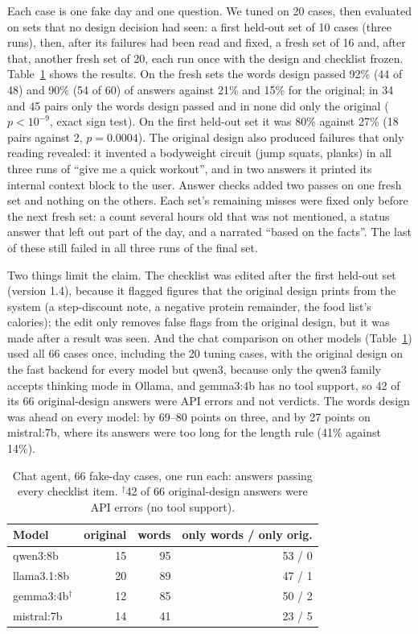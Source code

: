 \documentclass[10pt,twocolumn]{article}
\begin{document}
Each case is one fake day and one question. We tuned on 20 cases, then evaluated on sets that no design decision had seen:
a first held-out set of 10 cases (three runs), then, after its failures had been read and fixed, a fresh set of 16 and,
after that, another fresh set of 20, each run once with the design and checklist frozen. Table~\ref{tab:chat} shows the
results. On the fresh sets the words design passed 92\% (44 of 48) and 90\% (54 of 60) of answers against 21\% and 15\%
for the original; in 34 and 45 pairs only the words design passed and in none did only the original ($p<10^{-9}$, exact sign
test). On the first held-out set it was 80\% against 27\% (18 pairs against 2, $p=0.0004$). The original design also
produced failures that only reading revealed: it invented a bodyweight circuit (jump squats, planks) in all three runs of
``give me a quick workout'', and in two answers it printed its internal context block to the user. Answer checks added
two passes on one fresh set and nothing on the others. Each set's remaining misses were fixed only before the next
fresh set: a count several hours old that was not mentioned, a status answer that left out part of the day, and a narrated
``based on the facts''. The last of these still failed in all three runs of the final set.

Two things limit the claim. The checklist was edited after the first held-out set (version 1.4), because it flagged
figures that the original design prints from the system (a step-discount note, a negative protein remainder, the food
list's calories); the edit only removes false flags from the original design, but it was made after a result was seen.
And the chat comparison on other models (Table~\ref{tab:chat}) used all 66 cases once, including the 20 tuning cases, with the
original design on the fast backend for every model but qwen3, because only the qwen3 family accepts thinking mode in
Ollama, and gemma3:4b has no tool support, so 42 of its 66 original-design answers were API errors and not verdicts. The
words design was ahead on every model: by 69--80 points on three, and by 27 points on mistral:7b, where its answers were too long
for the length rule (41\% against 14\%).

\begin{table}[t]
\centering\small
\caption{Chat agent, 66 fake-day cases, one run each: answers passing every checklist item. $^\dagger$42 of 66 original-design
answers were API errors (no tool support).}
\label{tab:chat}
\begin{tabular}{lrrr}
\toprule
Model & original & words & only words / only orig.\\
\midrule
qwen3:8b & 15 & 95 & 53 / 0\\
llama3.1:8b & 20 & 89 & 47 / 1\\
gemma3:4b$^\dagger$ & 12 & 85 & 50 / 2\\
mistral:7b & 14 & 41 & 23 / 5\\
\bottomrule
\end{tabular}
\end{table}
\end{document}
